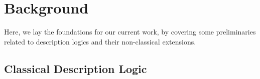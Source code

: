 \documentclass[letterpaper]{article} %
\theoremstyle{definition}
\theoremstyle{definition}
\theoremstyle{definition}
\theoremstyle{definition}
\theoremstyle{definition}
\begin{document}







\section{Background}

Here, we lay the foundations for our current work, by covering some preliminaries related to description logics and their non-classical extensions.


\subsection{Classical Description Logic}
\end{document}
